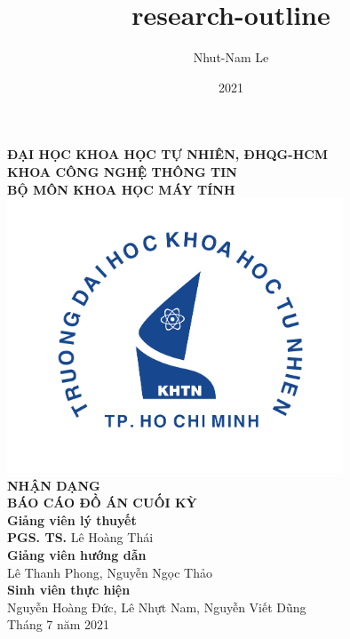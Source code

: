 \documentclass{article}
\title{research-outline}
\author{Nhut-Nam Le}
\date{2021}
\newcommand\B{\rule[-1.2ex]{0pt}{0pt}} %
\begin{document}
	
\newcommand*{\xMin}{0}%
\newcommand*{\xMax}{6}%
\newcommand*{\yMin}{0}%
\newcommand*{\yMax}{4}%

\newcommand*{\xMinR}{9.5}%
\newcommand*{\xMaxR}{12.5}%
\newcommand*{\yMinR}{1}%
\newcommand*{\yMaxR}{3}%


	\begin{titlepage}
		\begin{center}
			\large{\textbf{ĐẠI HỌC KHOA HỌC TỰ NHIÊN, ĐHQG-HCM\\KHOA CÔNG NGHỆ THÔNG TIN\\BỘ MÔN KHOA HỌC MÁY TÍNH}}\\
			\includegraphics[width=0.75\textwidth]{images/khtn.png}\\
			\huge \textbf{NHẬN DẠNG}\\[0.1in]
			\huge \textbf{BÁO CÁO ĐỒ ÁN CUỐI KỲ}\\[0.1in]
			\vfill
			\normalsize
			\normalsize
			\textbf{Giảng viên lý thuyết}\\
			{\textbf{PGS. TS.} Lê Hoàng Thái}\\[0.1in]
			\textbf{Giảng viên hướng dẫn}\\
			\vspace{0.1in}
			{Lê Thanh Phong, Nguyễn Ngọc Thảo}\\[0.1in]
			\textbf{Sinh viên thực hiện} \\
			\vspace{0.1in}
			{Nguyễn Hoàng Đức, Lê Nhựt Nam, Nguyễn Viết Dũng}\\[0.1in]
			\vfill
			Tháng 7 năm 2021
		\end{center}
	\end{titlepage}
	\newpage
	
\end{document}
